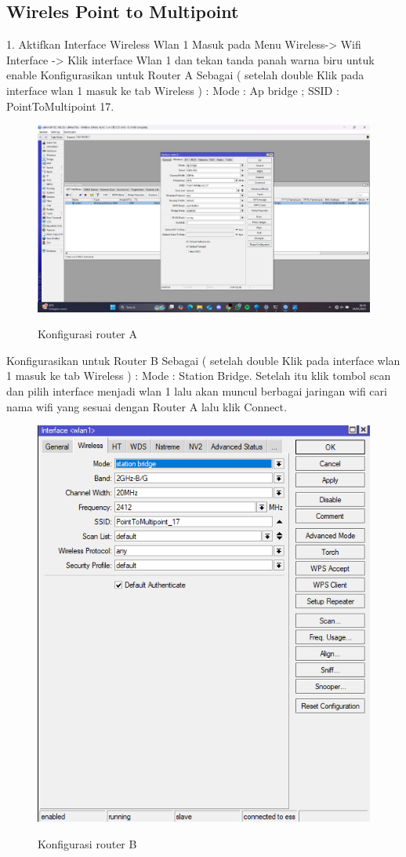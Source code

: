 \subsection{Wireles Point to Multipoint}
1. Aktifkan Interface Wireless Wlan 1 Masuk pada Menu Wireless-> Wifi Interface -> Klik interface Wlan 1 dan tekan tanda panah warna biru untuk enable Konfigurasikan untuk Router A Sebagai ( setelah double Klik pada interface wlan 1 masuk ke tab Wireless ) : Mode : Ap bridge ; SSID : PointToMultipoint 17.
\begin{figure}[H]
    \centering
    \includegraphics[width=0.65\linewidth]{image/station2.jpg}
    \label{fig:inirujukan}
    \caption{Konfigurasi router A}
\end{figure}
Konfigurasikan untuk Router B Sebagai ( setelah double Klik pada interface wlan 1 masuk ke tab Wireless ) : Mode : Station Bridge. Setelah itu klik tombol scan dan pilih interface menjadi wlan 1 lalu akan muncul berbagai jaringan wifi cari nama wifi yang sesuai dengan Router A lalu klik Connect.
\begin{figure}[H]
    \centering
    \includegraphics[width=0.65\linewidth]{image/station.png}
    \label{fig:inirujukan}
    \caption{Konfigurasi router B}
\end{figure}

